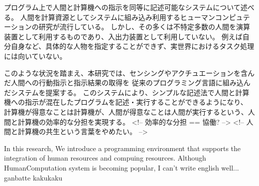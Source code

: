 \begin{jabstract}

プログラム上で人間と計算機への指示を同等に記述可能なシステムについて述べる。
人間を計算資源としてシステムに組み込み利用するヒューマンコンピュテーションの研究が流行している。
しかし、その多くは不特定多数の人間を演算装置として利用するものであり、入出力装置として利用していない。
例えば自分自身など、具体的な人物を指定することができず、実世界におけるタスク処理には向いていない。

このような状況を踏まえ、本研究では、センシングやアクチュエーションを含んだ人間への行動指示と指示結果の取得を
従来のプログラミング言語に組み込んだシステムを提案する。
このシステムにより、シンプルな記述法で人間と計算機への指示が混在したプログラムを記述・実行することができるようになり、
計算機が得意なことは計算機が、人間が得意なことは人間が実行するという、人間と計算機の効率的な分担を実現する。
<!-- 効率的な分担 == 協働? -->
<!-- 人間と計算機の共生という言葉をやめたい。 -->

\end{jabstract}

\begin{eabstract}

In this research, We introduce a programming environment that supports the integration of human resources and compuing resources.
Although HumanComputation system is becoming popular,
I can't write english well...
ganbatte kakukaku

\end{eabstract}
